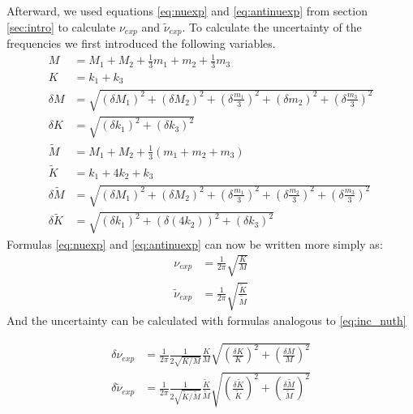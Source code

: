 \documentclass{article}
\begin{document}
Afterward, we used equations \ref{eq:nuexp} and \ref{eq:antinuexp} from section \ref{sec:intro} to calculate
$\nu_{exp}$ and $\tilde \nu_{exp}$. To calculate the uncertainty of the frequencies we first introduced the following variables.
\begin{align}
    M &= M_1 + M_2 + \frac{1}{3} m_1 + m_2 + \frac{1}{3}m_3\\
    K &= k_1 + k_3 \\
    \delta M &= \sqrt{
        ( \delta M_1)^2 + ( \delta M_2)^2 + 
        ( \delta \frac{m_1}{3} )^2 + ( \delta m_2)^2 + 
        ( \delta \frac{m_3}{3} )^2} \\
    \delta K &= \sqrt{
        ( \delta k_1)^2 + ( \delta k_3)^2 } \\
    \tilde M &= M_1 + M_2 + \frac{1}{3} (m_1 + m_2 + m_3) \\
    \tilde K &= k_1 +4k_2 +k_3 \\
    \delta \tilde M &= \sqrt{
        ( \delta M_1)^2 + ( \delta M_2)^2 + 
        ( \delta \frac{m_1}{3} )^2 + 
        ( \delta \frac{m_2}{3} )^2 +
        ( \delta \frac{m_3}{3} )^2} \\
    \delta \tilde K &= \sqrt{
        ( \delta k_1)^2 + ( \delta (4k_2))^2 + 
        ( \delta k_3)^2 } 
\end{align}
Formulas \ref{eq:nuexp} and \ref{eq:antinuexp} can now be written more simply as:
\begin{align}
    \nu_{exp} &= \frac{1}{2\pi}   \sqrt{\frac{ K}{M}} \\
    \tilde \nu_{exp} &= \frac{1}{2\pi}   \sqrt{
    \frac{\tilde K}{\tilde M}  }
\end{align}
And the uncertainty can be calculated with formulas analogous to \ref{eq:inc_nuth}


\begin{align}
\delta \nu_{exp} &= \frac{1}{2\pi} 
        \frac{1}{2\sqrt{K/M}}  \frac{K}{M} 
        \sqrt{ \left ( \frac{ \delta K}{K}  \right ) ^2 +
               \left ( \frac{ \delta M}{M}  \right ) ^2  } \\
    \delta \tilde \nu_{exp} &= \frac{1}{2\pi} 
        \frac{1}{2\sqrt{\tilde K/\tilde M}}  \frac{\tilde K}{\tilde M} 
        \sqrt{ \left ( \frac{ \delta \tilde K}{\tilde K}  \right ) ^2 +
               \left ( \frac{ \delta \tilde M}{\tilde M}  \right ) ^2  } 
\end{align}
           


\end{document}
